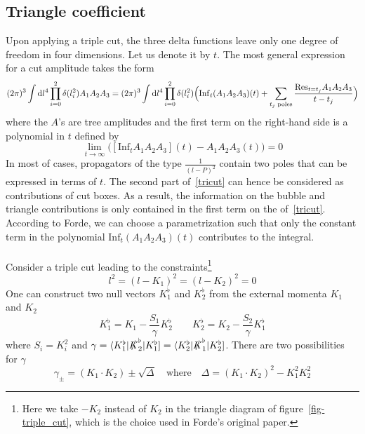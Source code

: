 \subsection*{Triangle coefficient} 
Upon applying a triple cut, the three delta functions leave only one degree of freedom in four dimensions. 
Let us denote it by $t$.
The most general expression for a cut amplitude takes the form 
\begin{equation}\label{tricut}
(2\pi)^3\int\textrm{d} l^4 \prod_{i=0}^2 \delta(l_i^2) A_1A_2A_3 = 
(2\pi)^3\int\textrm{d} l^4 \prod_{i=0}^2 \delta(l_i^2)\Big(\mathrm{Inf}_t(A_1A_2A_3)(t) + \sum_{\textrm{$t_j$ poles}}\frac{\mathrm{Res}_{t = t_j}A_1 A_2 A_3}{t-t_j}\Big)
\end{equation}
where the $A$'s are tree amplitudes and the first term on the right-hand side is a polynomial in $t$ defined by
\begin{equation}
\lim_{t\rightarrow\infty}\big([\mathrm{Inf}_tA_1A_2A_3](t) - A_1A_2A_3(t)\big) = 0
\end{equation}
In most of cases, propagators of the type $\frac{1}{(l-P)^2}$ contain two poles that can be expressed in terms of $t$. 
The second part of~\cref{tricut} can hence be considered as contributions of cut boxes. 
As a result, the information on the bubble and triangle contributions is only contained in the first term on the \rhs of~\cref{tricut}.
According to Forde, we can choose a parametrization such that only the constant term in the polynomial $\mathrm{Inf}_t(A_1A_2A_3)(t)$ contributes to the integral. 
%
\\\\
Consider a triple cut leading to the constraints\footnote{Here we take $-K_2$ instead of $K_2$ in the triangle diagram of figure~\ref{fig-triple_cut}, which is the choice used in Forde's original paper.}
\begin{equation}
l^2 = (l-K_1)^2 = (l - K_2)^2 = 0
\end{equation}
One can construct two null vectors $K_1^\flat$ and $K_2^\flat$ from the external momenta $K_1$ and $K_2$ 
\begin{equation}\label{k_flat}
K_1^\flat = K_1 - \frac{S_1}{\gamma}K_2^\flat \quad\quad
K_2^\flat = K_2 - \frac{S_2}{\gamma}K_1^\flat
\end{equation}
%
where $S_i = K_i^2$ and $\gamma = \langle K_1^\flat|\slashed{K}_2^\flat|K_1^\flat] =\langle K_2^\flat|\slashed{K}_1^\flat|K_2^\flat]$.
There are two possibilities for $\gamma$
\begin{equation}\label{sol_for_gamma}
\gamma_{\pm} = (K_1\cdot K_2) \pm\sqrt{\Delta}\quad
\mathrm{where}\quad
\Delta = (K_1\cdot K_2)^2 - K_1^2K_2^2
\end{equation}
